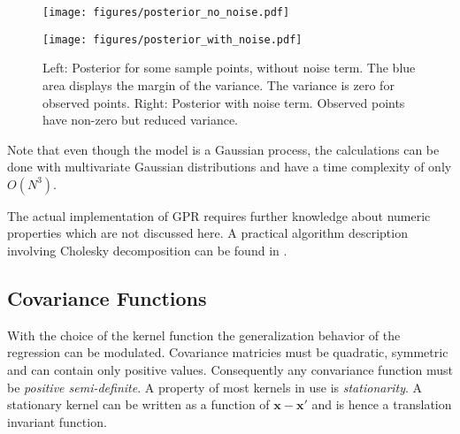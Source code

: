 \documentclass[english]{article}
\newcommand{\x}{\mathbf{x}}
\begin{document}
\begin{figure}

  \begin{minipage}{0.5\textwidth}
  \texttt{[image: figures/posterior\_no\_noise.pdf]}
  \end{minipage}%
  \begin{minipage}{0.5\textwidth}
  \texttt{[image: figures/posterior\_with\_noise.pdf]}
  \end{minipage}%

  \caption{Left: Posterior for some sample points, without noise term. The blue area displays the margin of the variance. The variance is zero for observed points. Right: Posterior with noise term. Observed points have non-zero but reduced variance.}
  \label{gpr}
\end{figure}


Note that even though the model is a Gaussian process, the calculations can be done with multivariate Gaussian distributions and have a time complexity of only $O(N^3)$.

The actual implementation of GPR requires further knowledge about numeric properties which are not discussed here. A practical algorithm description involving Cholesky decomposition can be found in \cite[Algorithm 2.1]{rasmussen_gaussian_2006}.




\subsection{Covariance Functions}
With the choice of the kernel function the generalization behavior of the regression can be modulated. Covariance matricies must be quadratic, symmetric and can contain only positive values. Consequently any convariance function must be \textit{positive semi-definite}. A property of most kernels in use is \textit{stationarity}. A stationary kernel can be written as a function of $\x-\x'$ and is hence a translation invariant function.

\end{document}
